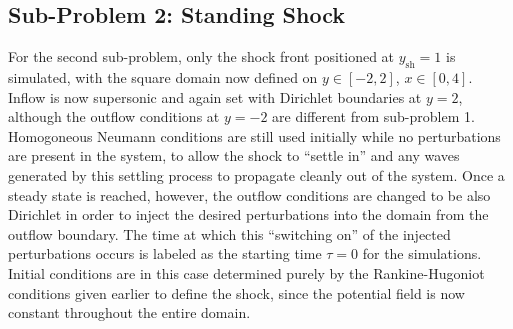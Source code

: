 \subsection{Sub-Problem 2: Standing Shock}
\label{subsec:sub_problem_2}

For the second sub-problem, only the shock front positioned at $y_\textrm{sh}=1$ is simulated, with the square domain now defined on $y\in[-2,2]$, $x\in[0,4]$. Inflow is now supersonic and again set with Dirichlet boundaries at $y=2$, although the outflow conditions at $y=-2$ are different from sub-problem 1. Homogoneous Neumann conditions are still used initially while no perturbations are present in the system, to allow the shock to ``settle in'' and any waves generated by this settling process to propagate cleanly out of the system. Once a steady state is reached, however, the outflow conditions are changed to be also Dirichlet in order to inject the desired perturbations into the domain from the outflow boundary. The time at which this ``switching on'' of the injected perturbations occurs is labeled as the starting time $\tau=0$ for the simulations. Initial conditions are in this case determined purely by the Rankine-Hugoniot conditions given earlier to define the shock, since the potential field is now constant throughout the entire domain.

